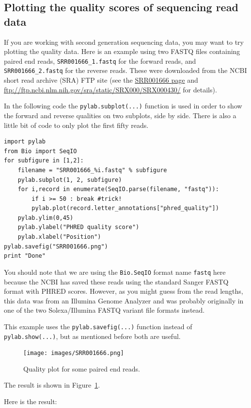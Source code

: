 \documentclass{report}
\begin{document}
\subsection{Plotting the quality scores of sequencing read data}

If you are working with second generation sequencing data, you may want to try plotting
the quality data. Here is an example using two FASTQ files containing paired end reads,
\texttt{SRR001666\_1.fastq} for the forward reads, and  \texttt{SRR001666\_2.fastq} for
the reverse reads. These were downloaded from the NCBI short read archive (SRA) FTP site
(see the \href{http://www.ncbi.nlm.nih.gov/Traces/sra/sra.cgi?cmd=viewer&m=data&s=viewer&run=SRR001666}
{SRR001666 page} and \url{ftp://ftp.ncbi.nlm.nih.gov/sra/static/SRX000/SRX000430/}
for details).

In the following code the \verb|pylab.subplot(...)| function is used in order to show
the forward and reverse qualities on two subplots, side by side. There is also a little
bit of code to only plot the first fifty reads.

\begin{verbatim}
import pylab
from Bio import SeqIO
for subfigure in [1,2]:
    filename = "SRR001666_%i.fastq" % subfigure
    pylab.subplot(1, 2, subfigure)
    for i,record in enumerate(SeqIO.parse(filename, "fastq")):
        if i >= 50 : break #trick!
        pylab.plot(record.letter_annotations["phred_quality"])
    pylab.ylim(0,45)
    pylab.ylabel("PHRED quality score")
    pylab.xlabel("Position")
pylab.savefig("SRR001666.png")
print "Done"
\end{verbatim}

You should note that we are using the \verb|Bio.SeqIO| format name \texttt{fastq}
here because the NCBI has saved these reads using the standard Sanger FASTQ format
with PHRED scores. However, as you might guess from the read lengths, this data was
from an Illumina Genome Analyzer and was probably originally in one of the two
Solexa/Illumina FASTQ variant file formats instead.

This example uses the \verb|pylab.savefig(...)| function instead of
\verb|pylab.show(...)|, but as mentioned before both are useful.
\begin{latexonly}
\begin{figure}[htbp]
\centering
\texttt{[image: images/SRR001666.png]}
\caption{Quality plot for some paired end reads.}
\label{fig:paired-end-qual-plot}
\end{figure}
The result is shown in Figure~\ref{fig:paired-end-qual-plot}.
\end{latexonly}
\begin{htmlonly}
Here is the result:


\end{htmlonly}
\end{document}
